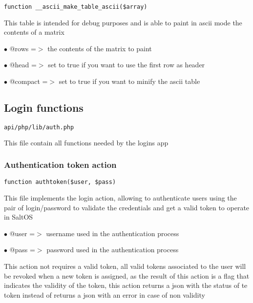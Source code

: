 \documentclass[a4paper]{article}
\begin{document}
\begin{lstlisting}
function __ascii_make_table_ascii($array)
\end{lstlisting}

This table is intended for debug purposes and is able to paint in ascii
mode the contents of a matrix

\begin{compactitem}
\item[\color{myblue}$\bullet$] @rows    =$>$ the contents of the matrix to paint
\item[\color{myblue}$\bullet$] @head    =$>$ set to true if you want to use the first row as header
\item[\color{myblue}$\bullet$] @compact =$>$ set to true if you want to minify the ascii table
\end{compactitem}

\hypertarget{toc374}{}
\subsection{Login functions}

\begin{lstlisting}
api/php/lib/auth.php
\end{lstlisting}

This file contain all functions needed by the logins app

\hypertarget{toc375}{}
\subsubsection{Authentication token action}

\begin{lstlisting}
function authtoken($user, $pass)
\end{lstlisting}

This file implements the login action, allowing to authenticate users using the pair
of login/password to validate the credentials and get a valid token to operate in SaltOS

\begin{compactitem}
\item[\color{myblue}$\bullet$] @user =$>$ username used in the authentication process
\item[\color{myblue}$\bullet$] @pass =$>$ password used in the authentication process
\end{compactitem}

This action not requires a valid token, all valid tokens associated
to the user will be revoked when a new token is assigned, as the result of this action
is a flag that indicates the validity of the token, this action returns a json with the
status of te token instead of returns a json with an error in case of non validity
\end{document}
